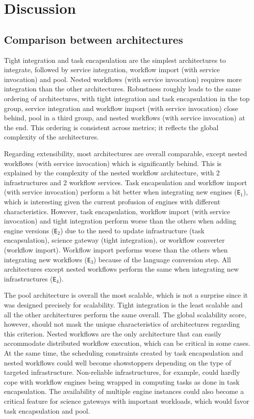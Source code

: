 \documentclass[preprint,3p,twocolumn]{elsarticle}
\begin{document}
\section{Discussion}

\subsection{Comparison between architectures}

Tight integration and task encapsulation are the simplest
architectures to integrate, followed by service integration, workflow import (with
service invocation) and pool. Nested workflows (with service
invocation) requires more integration than the other
architectures. Robustness roughly leads to the same ordering of
architectures, with tight integration and task encapsulation in the top
group, service integration and workflow import (with service
invocation) close behind, pool in a third group, and nested workflows
(with service invocation) at the end. This ordering is consistent
across metrics; it reflects the global complexity of the
architectures.

Regarding extensibility, most architectures are overall comparable,
except nested workflows (with service invocation) which is
significantly behind. This is explained by the complexity of the
nested workflow architecture, with 2 infrastructures and 2 workflow
services. Task encapsulation and workflow import (with service invocation)
perform a bit better when integrating new engines (\texttt{E$_1$}),
which is interesting given the current profusion of engines with
different characteristics.  However, task encapsulation, workflow import
(with service invocation) and tight integration perform worse than the
others when adding engine versions (\texttt{E$_2$}) due to the need to
update infrastructure (task encapsulation), science gateway (tight
integration), or workflow converter (workflow import). Workflow import
performs worse than the others when integrating new workflows
(\texttt{E$_3$}) because of the language conversion step. All
architectures except nested workflows perform the same when
integrating new infrastructures (\texttt{E$_4$}).

The pool architecture is overall the most scalable, which is not a
surprise since it was designed precisely for scalability. Tight
integration is the least scalable and all the other architectures
perform the same overall. The global scalability score, however, should not
mask the unique characteristics of architectures regarding this
criterion. Nested workflows are the only architecture that can easily
accommodate distributed workflow execution, which can be critical in
some cases. At the same time, the scheduling constraints created by
task encapsulation and nested workflows could well become
showstoppers depending on the type of targeted
infrastructure. Non-reliable infrastructures, for example, could
hardly cope with workflow engines being wrapped in computing tasks as
done in task encapsulation. The availability of multiple engine instances
could also become a critical feature for science gateways with
important workloads, which would favor task encapsulation and pool.
\end{document}
